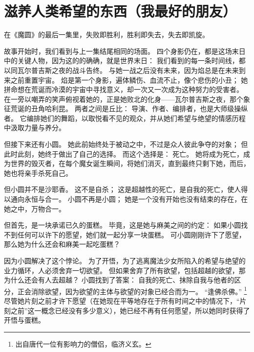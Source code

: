 \chapter[滋养人类希望的东西（我最好的朋友）]{滋养人类希望的东西\protect\footnotemark（我最好的朋友）}


在《魔圆》的最后一集里，失败即胜利，胜利即失去，失去即凯旋。

故事开始时，我们看到与上一集结尾相同的场面。
四个身影仍在，都是这场末日中的关键人物，因为这的的确确，就是世界末日：
我们看到的每一条时间线，都以同瓦尔普吉斯之夜的战斗告终。
与她一战之后没有未来，因为焰总是在未来到来之前重置宇宙。
焰是第一个身影，遍体鳞伤、血流不止，像个悲伤的小丑；
她拼命想在荒诞而冷漠的宇宙中寻找意义，却一次又一次成为这种努力的受害者。
在一旁以嘲弄的笑声俯视着她的，正是她败北的化身——瓦尔普吉斯之夜，那个象征荒诞的丑角哈利昆。
两者之间是丘比：
导演、作者、编排者，也是大师级操纵者。
它编排她们的舞蹈，以取悦看不见的观众，并从她们希望与绝望的情感历程中汲取力量与养分。

但接下来还有小圆。
她此前始终处于被动之中，不过是众人彼此争夺的对象；
但此时此刻，她终于做出了自己的选择。
而这个选择是：
死亡。
她将成为死亡，成为世界的毁灭者，在每个魔女诞生瞬间，将她们消灭，直到最终只剩下她，而后，她也将亲手杀死自己。

但小圆并不是沙耶香。
这不是自杀；
这是超越性的死亡，是自我的死亡，使人得以通向永恒与合一\cite{ref62}。
小圆不再是小圆；
她是一个没有开始也没有结束的存在，在她之中，万物合一。

但首先，是一块承诺已久的蛋糕。
毕竟，这是她与麻美之间的约定：
如果小圆找不到任何可以许下的愿望，她们就一起分享一块蛋糕。
可小圆刚刚许下了愿望，那么她为什么还会和麻美一起吃蛋糕？

因为小圆解决了这个悖论。
为了开悟，为了逃离魔法少女所陷入的希望与绝望的业力循环，人必须舍弃一切欲望。
但如果舍弃了所有欲望，包括超越的欲望，那为什么还会有人去超越？
小圆找到了答案：
自我的死亡、抹除自我与他者的区分，正会消除欲望，因为欲望的主体与欲望的对象已经合而为一。
“逢佛杀佛。”
\footnote{%
    出自唐代一位有影响力的僧侣，临济义玄。
}\cite{ref71}尽管她片刻之前才许下愿望（在她现在平等地存在于所有时间之中的情况下，“片刻之前”这一概念已经没有多少意义），她已经不再有任何愿望，所以她同时获得了开悟与蛋糕。

